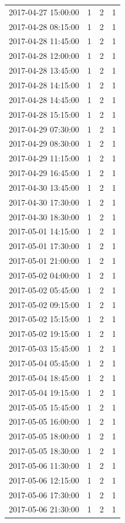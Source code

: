 \begin{tabular}{lrrr}
2017-04-27 15:00:00 & 1 & 2 & 1 \\
2017-04-28 08:15:00 & 1 & 2 & 1 \\
2017-04-28 11:45:00 & 1 & 2 & 1 \\
2017-04-28 12:00:00 & 1 & 2 & 1 \\
2017-04-28 13:45:00 & 1 & 2 & 1 \\
2017-04-28 14:15:00 & 1 & 2 & 1 \\
2017-04-28 14:45:00 & 1 & 2 & 1 \\
2017-04-28 15:15:00 & 1 & 2 & 1 \\
2017-04-29 07:30:00 & 1 & 2 & 1 \\
2017-04-29 08:30:00 & 1 & 2 & 1 \\
2017-04-29 11:15:00 & 1 & 2 & 1 \\
2017-04-29 16:45:00 & 1 & 2 & 1 \\
2017-04-30 13:45:00 & 1 & 2 & 1 \\
2017-04-30 17:30:00 & 1 & 2 & 1 \\
2017-04-30 18:30:00 & 1 & 2 & 1 \\
2017-05-01 14:15:00 & 1 & 2 & 1 \\
2017-05-01 17:30:00 & 1 & 2 & 1 \\
2017-05-01 21:00:00 & 1 & 2 & 1 \\
2017-05-02 04:00:00 & 1 & 2 & 1 \\
2017-05-02 05:45:00 & 1 & 2 & 1 \\
2017-05-02 09:15:00 & 1 & 2 & 1 \\
2017-05-02 15:15:00 & 1 & 2 & 1 \\
2017-05-02 19:15:00 & 1 & 2 & 1 \\
2017-05-03 15:45:00 & 1 & 2 & 1 \\
2017-05-04 05:45:00 & 1 & 2 & 1 \\
2017-05-04 18:45:00 & 1 & 2 & 1 \\
2017-05-04 19:15:00 & 1 & 2 & 1 \\
2017-05-05 15:45:00 & 1 & 2 & 1 \\
2017-05-05 16:00:00 & 1 & 2 & 1 \\
2017-05-05 18:00:00 & 1 & 2 & 1 \\
2017-05-05 18:30:00 & 1 & 2 & 1 \\
2017-05-06 11:30:00 & 1 & 2 & 1 \\
2017-05-06 12:15:00 & 1 & 2 & 1 \\
2017-05-06 17:30:00 & 1 & 2 & 1 \\
2017-05-06 21:30:00 & 1 & 2 & 1 \\

\end{tabular}

